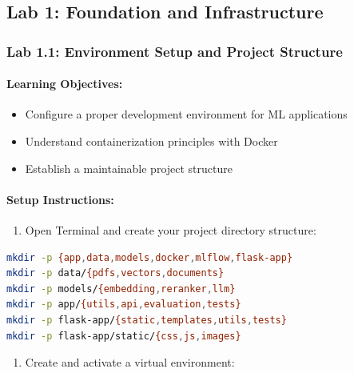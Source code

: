 \documentclass[
  screen,review,acmlarge]{acmart}
\providecommand{\tightlist}{%
  \setlength{\itemsep}{0pt}\setlength{\parskip}{0pt}}
\begin{document}
\subsection{Lab 1: Foundation and Infrastructure}\label{lab-1-foundation-and-infrastructure}

\subsubsection{Lab 1.1: Environment Setup and Project Structure}\label{lab-1.1-environment-setup-and-project-structure}

\paragraph{Learning Objectives:}\label{learning-objectives}

\begin{itemize}
\tightlist
\item
  Configure a proper development environment for ML applications
\item
  Understand containerization principles with Docker
\item
  Establish a maintainable project structure
\end{itemize}

\paragraph{Setup Instructions:}\label{setup-instructions}

\begin{enumerate}
\def\labelenumi{\arabic{enumi}.}
\tightlist
\item
  Open Terminal and create your project directory structure:
\end{enumerate}

\begin{lstlisting}[language=bash]
mkdir -p {app,data,models,docker,mlflow,flask-app}
mkdir -p data/{pdfs,vectors,documents}
mkdir -p models/{embedding,reranker,llm}
mkdir -p app/{utils,api,evaluation,tests}
mkdir -p flask-app/{static,templates,utils,tests}
mkdir -p flask-app/static/{css,js,images}
\end{lstlisting}

\begin{enumerate}
\def\labelenumi{\arabic{enumi}.}
\setcounter{enumi}{1}
\tightlist
\item
  Create and activate a virtual environment:
\end{enumerate}
\end{document}
